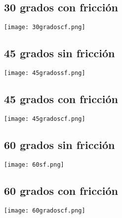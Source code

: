 \documentclass[10pt]{article}
\begin{document}
\subsection{30 grados con fricción}
\begin{center}
   \texttt{[image: 30gradoscf.png]}
\end{center}


\subsection{45 grados sin fricción}
\begin{center}
   \texttt{[image: 45gradossf.png]}
\end{center}

\subsection{45 grados con fricción}
\begin{center}
   \texttt{[image: 45gradoscf.png]}
\end{center}


\subsection{60 grados sin fricción}
\begin{center}
   \texttt{[image: 60sf.png]}
\end{center}

\subsection{60 grados con fricción}
\begin{center}
   \texttt{[image: 60gradoscf.png]}
\end{center}



\end{document}
